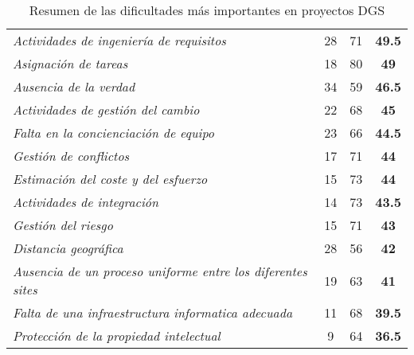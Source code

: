 \begin{table}[htbp]
{\begin{tabular}{|l|c|c|c|}
        \rowcolor[rgb]{ .949,  .949,  .949} \textit{Actividades de ingeniería de requisitos} & \cellcolor[rgb]{ 1,  1,  1}28 & \cellcolor[rgb]{ 1,  1,  1}71 & \cellcolor[rgb]{ 1,  1,  1}\textbf{49.5} \\
        \rowcolor[rgb]{ .949,  .949,  .949} \textit{Asignación de tareas} & \cellcolor[rgb]{ 1,  1,  1}18 & \cellcolor[rgb]{ 1,  1,  1}80 & \cellcolor[rgb]{ 1,  1,  1}\textbf{49} \\
        \rowcolor[rgb]{ .949,  .949,  .949} \textit{Ausencia de la verdad} & \cellcolor[rgb]{ 1,  1,  1}34 & \cellcolor[rgb]{ 1,  1,  1}59 & \cellcolor[rgb]{ 1,  1,  1}\textbf{46.5} \\
        \rowcolor[rgb]{ .949,  .949,  .949} \textit{Actividades de gestión del cambio} & \cellcolor[rgb]{ 1,  1,  1}22 & \cellcolor[rgb]{ 1,  1,  1}68 & \cellcolor[rgb]{ 1,  1,  1}\textbf{45} \\
        \rowcolor[rgb]{ .949,  .949,  .949} \textit{Falta en la concienciación de equipo} & \cellcolor[rgb]{ 1,  1,  1}23 & \cellcolor[rgb]{ 1,  1,  1}66 & \cellcolor[rgb]{ 1,  1,  1}\textbf{44.5} \\
        \rowcolor[rgb]{ .949,  .949,  .949} \textit{Gestión de conflictos} & \cellcolor[rgb]{ 1,  1,  1}17 & \cellcolor[rgb]{ 1,  1,  1}71 & \cellcolor[rgb]{ 1,  1,  1}\textbf{44} \\
        \rowcolor[rgb]{ .949,  .949,  .949} \textit{Estimación del coste y del esfuerzo} & \cellcolor[rgb]{ 1,  1,  1}15 & \cellcolor[rgb]{ 1,  1,  1}73 & \cellcolor[rgb]{ 1,  1,  1}\textbf{44} \\
        \rowcolor[rgb]{ .949,  .949,  .949} \textit{Actividades de integración} & \cellcolor[rgb]{ 1,  1,  1}14 & \cellcolor[rgb]{ 1,  1,  1}73 & \cellcolor[rgb]{ 1,  1,  1}\textbf{43.5} \\
        \rowcolor[rgb]{ .949,  .949,  .949} \textit{Gestión del riesgo} & \cellcolor[rgb]{ 1,  1,  1}15 & \cellcolor[rgb]{ 1,  1,  1}71 & \cellcolor[rgb]{ 1,  1,  1}\textbf{43} \\
        \rowcolor[rgb]{ .949,  .949,  .949} \textit{Distancia geográfica} & \cellcolor[rgb]{ 1,  1,  1}28 & \cellcolor[rgb]{ 1,  1,  1}56 & \cellcolor[rgb]{ 1,  1,  1}\textbf{42} \\
        \rowcolor[rgb]{ .949,  .949,  .949} \textit{Ausencia de un proceso uniforme entre los diferentes sites} & \cellcolor[rgb]{ 1,  1,  1}19 & \cellcolor[rgb]{ 1,  1,  1}63 & \cellcolor[rgb]{ 1,  1,  1}\textbf{41} \\
        \rowcolor[rgb]{ .949,  .949,  .949} \textit{Falta de una infraestructura informatica adecuada} & \cellcolor[rgb]{ 1,  1,  1}11 & \cellcolor[rgb]{ 1,  1,  1}68 & \cellcolor[rgb]{ 1,  1,  1}\textbf{39.5} \\
        \rowcolor[rgb]{ .949,  .949,  .949} \textit{Protección de la propiedad intelectual} & \cellcolor[rgb]{ 1,  1,  1}9 & \cellcolor[rgb]{ 1,  1,  1}64 & \cellcolor[rgb]{ 1,  1,  1}\textbf{36.5} \\
    \end{tabular}}
  \caption{Resumen de las dificultades más importantes en proyectos DGS}
  \label{tab:DificultadesDGS}
\end{table}

